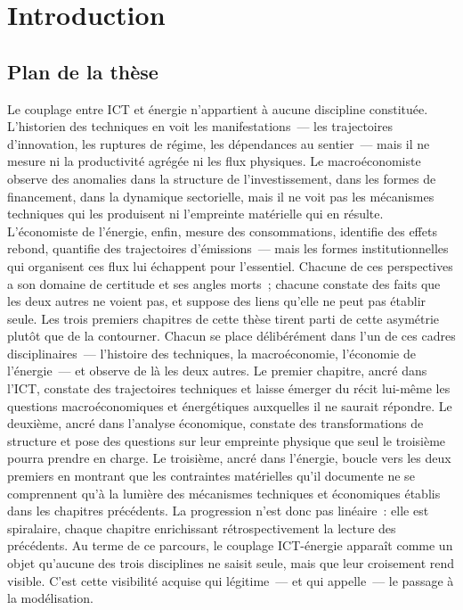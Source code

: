 
\chapter*{Introduction}\label{ch:introduction}

\section*{Plan de la thèse}

Le couplage entre ICT et énergie n'appartient à aucune discipline constituée. L'historien des techniques en voit les manifestations~--- les trajectoires d'innovation, les ruptures de régime, les dépendances au sentier~--- mais il ne mesure ni la productivité agrégée ni les flux physiques. Le macroéconomiste observe des anomalies dans la structure de l'investissement, dans les formes de financement, dans la dynamique sectorielle, mais il ne voit pas les mécanismes techniques qui les produisent ni l'empreinte matérielle qui en résulte. L'économiste de l'énergie, enfin, mesure des consommations, identifie des effets rebond, quantifie des trajectoires d'émissions~--- mais les formes institutionnelles qui organisent ces flux lui échappent pour l'essentiel. Chacune de ces perspectives a son domaine de certitude et ses angles morts~; chacune constate des faits que les deux autres ne voient pas, et suppose des liens qu'elle ne peut pas établir seule. Les trois premiers chapitres de cette thèse tirent parti de cette asymétrie plutôt que de la contourner. Chacun se place délibérément dans l'un de ces cadres disciplinaires~--- l'histoire des techniques, la macroéconomie, l'économie de l'énergie~--- et observe de là les deux autres. Le premier chapitre, ancré dans l'ICT, constate des trajectoires techniques et laisse émerger du récit lui-même les questions macroéconomiques et énergétiques auxquelles il ne saurait répondre. Le deuxième, ancré dans l'analyse économique, constate des transformations de structure et pose des questions sur leur empreinte physique que seul le troisième pourra prendre en charge. Le troisième, ancré dans l'énergie, boucle vers les deux premiers en montrant que les contraintes matérielles qu'il documente ne se comprennent qu'à la lumière des mécanismes techniques et économiques établis dans les chapitres précédents. La progression n'est donc pas linéaire~: elle est spiralaire, chaque chapitre enrichissant rétrospectivement la lecture des précédents. Au terme de ce parcours, le couplage ICT-énergie apparaît comme un objet qu'aucune des trois disciplines ne saisit seule, mais que leur croisement rend visible. C'est cette visibilité acquise qui légitime~--- et qui appelle~--- le passage à la modélisation.

